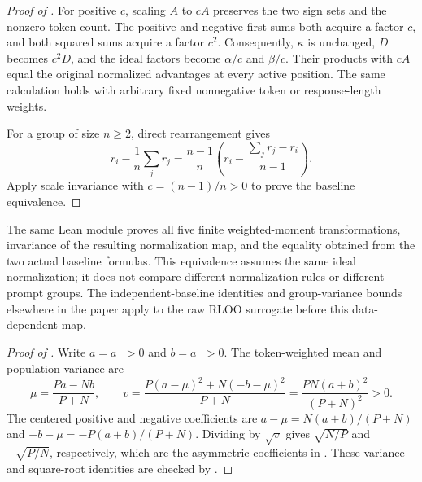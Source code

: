 \begin{proof}[Proof of ]
For positive $c$, scaling $A$ to $cA$ preserves the two sign sets and the
nonzero-token count. The positive and negative first sums both acquire a
factor $c$, and both squared sums acquire a factor $c^2$. Consequently,
$\kappa$ is unchanged, $D$ becomes $c^2D$, and the ideal factors become
$\alpha/c$ and $\beta/c$. Their products with $cA$ equal the original
normalized advantages at every active position. The same calculation
holds with arbitrary fixed nonnegative token or response-length weights.

For a group of size $n\ge2$, direct rearrangement gives
\[
 r_i-\frac{1}{n}\sum_j r_j
 =\frac{n-1}{n}
   \left(r_i-\frac{\sum_j r_j-r_i}{n-1}\right).
\]
Apply scale invariance with $c=(n-1)/n>0$ to prove the baseline equivalence.
\end{proof}

The same Lean module proves all five finite weighted-moment transformations,
invariance of the resulting normalization map, and the equality obtained
from the two actual baseline formulas.
This equivalence assumes the same ideal normalization;
it does not compare different normalization rules or different prompt groups.
The independent-baseline identities and group-variance bounds elsewhere in
the paper apply to the raw RLOO surrogate before this data-dependent map.

\begin{proof}[Proof of ]
Write $a=a_+>0$ and $b=a_->0$. The token-weighted mean and population
variance are
\[
 \mu=\frac{Pa-Nb}{P+N},\qquad
 v=\frac{P(a-\mu)^2+N(-b-\mu)^2}{P+N}
   =\frac{PN(a+b)^2}{(P+N)^2}>0.
\]
The centered positive and negative coefficients are
$a-\mu=N(a+b)/(P+N)$ and $-b-\mu=-P(a+b)/(P+N)$.
Dividing by $\sqrt v$ gives $\sqrt{N/P}$ and $-\sqrt{P/N}$, respectively,
which are the asymmetric coefficients in
. These variance and square-root
identities are checked by .
\end{proof}

